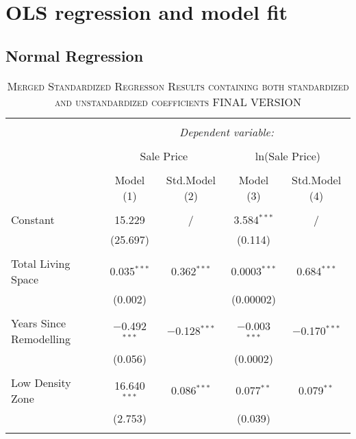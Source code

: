 \documentclass[a4paper]{article}
\begin{document}
\section{OLS regression and model fit}
\subsection{Normal Regression}



\begin{table}[!htbp] \centering 
\begin{adjustwidth}{-0.0cm}{-0cm}
\begin{threeparttable}
\small
\captionsetup{font=small, justification=raggedright,singlelinecheck=false}
\caption{\textsc{Merged Standardized Regresson Results containing both standardized and unstandardized coefficients FINAL VERSION}}
\centering 
  \label{}
\small 
\begin{tabular}{@{\extracolsep{-1pt}}lcccc} 
\\[-5.8ex]\hline 
\hline \\[-1.8ex] 
 & \multicolumn{4}{c}{\textit{Dependent variable:}} \\ 
\cline{2-5} 
\\[-1.8ex] & \multicolumn{2}{c}{Sale Price} & \multicolumn{2}{c}{ln(Sale Price)} \\ 
\\[-1.8ex] & Model (1) & Std.Model (2) & Model (3) & Std.Model (4)\\ 
\hline \\[-1.8ex] 
 Constant & 15.229 & / & 3.584$^{***}$ & / \\ 
  & (25.697) &  & (0.114) &  \\ 
  & & & & \\ 
 Total Living Space & 0.035$^{***}$ & 0.362$^{***}$ & 0.0003$^{***}$ & 0.684$^{***}$ \\ 
  & (0.002) &  & (0.00002) &  \\ 
  & & & & \\ 
 Years Since Remodelling & $-$0.492$^{***}$ & $-$0.128$^{***}$ & $-$0.003$^{***}$ & $-$0.170$^{***}$ \\ 
  & (0.056) &  & (0.0002) &  \\ 
  & & & & \\ 
 Low Density Zone & 16.640$^{***}$ & 0.086$^{***}$ & 0.077$^{**}$ & 0.079$^{**}$ \\ 
  & (2.753) &  & (0.039) &  \\ 
  & & & & \\ 

\end{tabular}
\end{threeparttable}
\end{adjustwidth}
\end{table}
\end{document}
